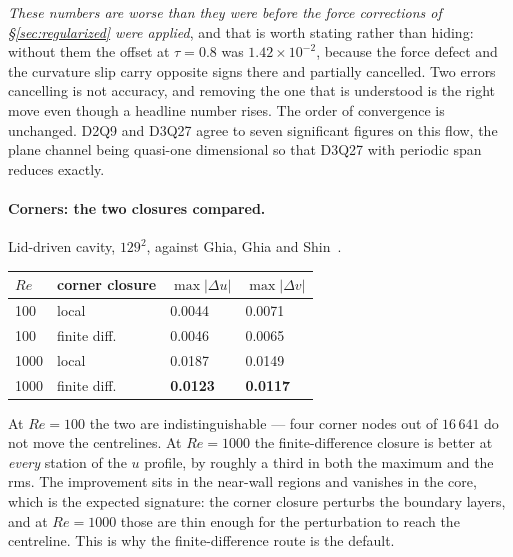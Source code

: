 \documentclass[11pt,a4paper]{article}
\newcommand{\e}[1]{\times 10^{#1}}
\begin{document}
\emph{These numbers are worse than they were before the force corrections of
\S\ref{sec:regularized} were applied}, and that is worth stating rather than
hiding: without them the offset at $\tau=0.8$ was $1.42\e{-2}$, because the
force defect and the curvature slip carry opposite signs there and partially
cancelled. Two errors cancelling is not accuracy, and removing the one that is
understood is the right move even though a headline number rises. The order of
convergence is unchanged. D2Q9 and D3Q27 agree to
seven significant figures on this flow, the plane channel being quasi-one
dimensional so that D3Q27 with periodic span reduces exactly.

\paragraph{Corners: the two closures compared.} Lid-driven cavity, $129^2$,
against Ghia, Ghia and Shin~\cite{ghia1982}.
\begin{center}\small
\begin{tabular}{llll}
\toprule
$Re$ & corner closure & $\max|\Delta u|$ & $\max|\Delta v|$ \\
\midrule
100  & local        & 0.0044 & 0.0071 \\
100  & finite diff. & 0.0046 & 0.0065 \\
1000 & local        & 0.0187 & 0.0149 \\
1000 & finite diff. & \textbf{0.0123} & \textbf{0.0117} \\
\bottomrule
\end{tabular}
\end{center}
\noindent At $Re=100$ the two are indistinguishable --- four corner nodes out of
$16\,641$ do not move the centrelines. At $Re=1000$ the finite-difference closure
is better at \emph{every} station of the $u$ profile, by roughly a third in both
the maximum and the rms. The improvement sits in the near-wall regions and
vanishes in the core, which is the expected signature: the corner closure
perturbs the boundary layers, and at $Re=1000$ those are thin enough for the
perturbation to reach the centreline. This is why the finite-difference route is
the default.
\end{document}
